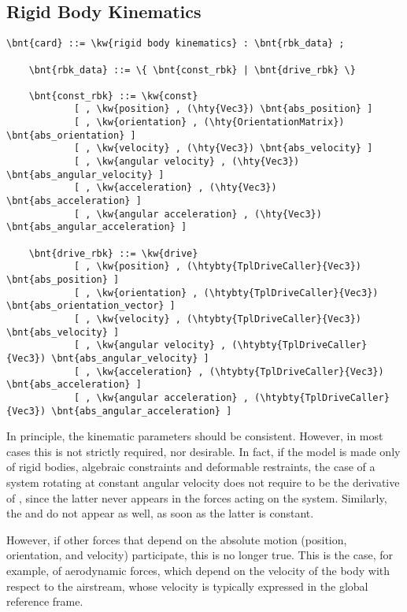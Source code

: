\subsection{Rigid Body Kinematics}
\label{sec:CONTROLDATA:RBK}
\begin{Verbatim}[commandchars=\\\{\}]
    \bnt{card} ::= \kw{rigid body kinematics} : \bnt{rbk_data} ;

    \bnt{rbk_data} ::= \{ \bnt{const_rbk} | \bnt{drive_rbk} \}

    \bnt{const_rbk} ::= \kw{const}
            [ , \kw{position} , (\hty{Vec3}) \bnt{abs_position} ]
            [ , \kw{orientation} , (\hty{OrientationMatrix}) \bnt{abs_orientation} ]
            [ , \kw{velocity} , (\hty{Vec3}) \bnt{abs_velocity} ]
            [ , \kw{angular velocity} , (\hty{Vec3}) \bnt{abs_angular_velocity} ]
            [ , \kw{acceleration} , (\hty{Vec3}) \bnt{abs_acceleration} ]
            [ , \kw{angular acceleration} , (\hty{Vec3}) \bnt{abs_angular_acceleration} ]

    \bnt{drive_rbk} ::= \kw{drive}
            [ , \kw{position} , (\htybty{TplDriveCaller}{Vec3}) \bnt{abs_position} ]
            [ , \kw{orientation} , (\htybty{TplDriveCaller}{Vec3}) \bnt{abs_orientation_vector} ]
            [ , \kw{velocity} , (\htybty{TplDriveCaller}{Vec3}) \bnt{abs_velocity} ]
            [ , \kw{angular velocity} , (\htybty{TplDriveCaller}{Vec3}) \bnt{abs_angular_velocity} ]
            [ , \kw{acceleration} , (\htybty{TplDriveCaller}{Vec3}) \bnt{abs_acceleration} ]
            [ , \kw{angular acceleration} , (\htybty{TplDriveCaller}{Vec3}) \bnt{abs_angular_acceleration} ]
\end{Verbatim}
In principle, the kinematic parameters should be consistent.
However, in most cases this is not strictly required, nor desirable.
In fact, if the model is made only of rigid bodies, algebraic constraints
and deformable restraints, the case of a system rotating
at constant angular velocity does not require 
to be the derivative of , since the latter
never appears in the forces acting on the system.
Similarly, the  and 
do not appear as well, as soon as the latter is constant.

However, if other forces that depend on the absolute motion
(position, orientation, and velocity) participate, this is no longer true.
This is the case, for example, of aerodynamic forces,
which depend on the velocity of the body with respect to the airstream,
whose velocity is typically expressed in the global reference frame.



